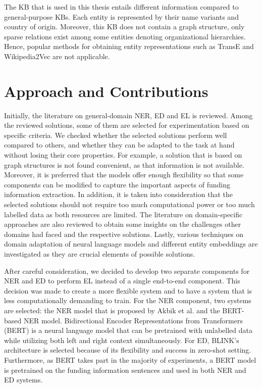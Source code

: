 \documentclass{report}
\theoremstyle{definition}
\theoremstyle{remark}
\begin{document}
The KB that is used in this thesis entails different information compared to general-purpose KBs. Each entity is represented by their name variants and country of origin. Moreover, this KB does not contain a graph structure, only sparse relations exist among some entities denoting organizational hierarchies. Hence, popular methods for obtaining entity representations such as TransE \cite{TransE} and Wikipedia2Vec \cite{wikipedia2vec2} are not applicable.

\section{Approach and Contributions}
Initially, the literature on general-domain NER, ED and EL is reviewed. Among the reviewed solutions, some of them are selected for experimentation based on specific criteria. We checked whether the selected solutions perform well compared to others, and whether they can be adapted to the task at hand without losing their core properties. For example, a solution that is based on graph structures \cite{graphcitation1} is not found convenient, as that information is not available. Moreover, it is preferred that the models offer enough flexibility so that some components can be modified to capture the important aspects of funding information extraction. In addition, it is taken into consideration that the selected solutions should not require too much computational power or too much labelled data as both resources are limited. The literature on domain-specific approaches are also reviewed to obtain some insights on the challenges other domains had faced and the respective solutions. Lastly, various techniques on domain adaptation of neural language models and different entity embeddings are investigated as they are crucial elements of possible solutions.  

After careful consideration, we decided to develop two separate components for NER and ED to perform EL instead of a single end-to-end component. This decision was made to create a more flexible system and to have a system that is less computationally demanding to train. For the NER component, two systems are selected: the NER model that is proposed by Akbik et al. \cite{flairlib} and the BERT-based NER model. Bidirectional Encoder Representations from Transformers (BERT) \cite{BERT} is a neural language model that can be pretrained with unlabelled data while utilizing both left and right context simultaneously. For ED, BLINK's architecture \cite{scalablezeroshot} is selected because of its flexibility and success in zero-shot setting. Furthermore, as BERT takes part in the majority of experiments, a BERT model is pretrained on the funding information sentences and used in both NER and ED systems. 
\end{document}
